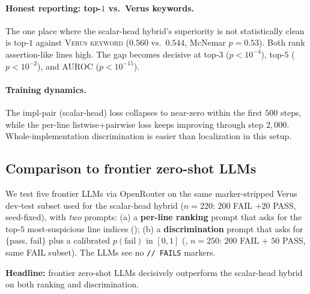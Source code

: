 \documentclass[10pt]{article}
\begin{document}
\paragraph{Honest reporting: top-$1$ vs.\ Verus keywords.}
The one place where the scalar-head hybrid's superiority is not statistically clean is
top-$1$ against \normalfont\textsc{Verus keyword} ($0.560$ vs.\ $0.544$, McNemar
$p=0.53$). Both rank assertion-like lines high. The gap becomes decisive at
top-$3$ ($p<10^{-4}$), top-$5$ ($p<10^{-2}$), and AUROC ($p<10^{-15}$).

\paragraph{Training dynamics.}
The impl-pair (scalar-head) loss collapses to near-zero within the
first $500$ steps, while the per-line listwise+pairwise loss keeps
improving through step $2{,}000$. Whole-implementation discrimination
is easier than localization in this setup.

\subsection{Comparison to frontier zero-shot LLMs}
\label{sec:results:llm-zeroshot}

We test five frontier LLMs via OpenRouter on the same marker-stripped
Verus dev-test subset used for the scalar-head hybrid ($n=220$:
$200$ FAIL $+ 20$ PASS, seed-fixed), with \emph{two} prompts:
(a) a \textbf{per-line ranking} prompt that asks for the top-$5$
most-suspicious line indices (); (b) a
\textbf{discrimination} prompt that asks for $\{$pass, fail$\}$ plus
a calibrated $p(\text{fail})$ in $[0, 1]$
(, $n=250$: $200$ FAIL + $50$ PASS,
same FAIL subset). The LLMs see no \texttt{// FAILS} markers.

\textbf{Headline:} frontier zero-shot LLMs decisively outperform the
scalar-head hybrid on both ranking and discrimination.
\end{document}
